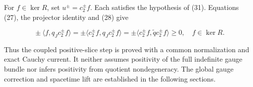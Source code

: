 For $f\in\ker R$, set $u^\pm=c_2^\pm f$. Each satisfies the hypothesis of (31). Equations (27), the projector identity and (28) give

\[
 \boxed{\ 
 \pm\langle f,q_Jc_2^\pm f\rangle
 =\pm\langle c_2^\pm f,q_Jc_2^\pm f\rangle
 =\pm\langle c_2^\pm f,\widetilde q c_2^\pm f\rangle\ge0,
 \quad f\in\ker R.
 \ }
 \tag{32}
\]

Thus the coupled positive-slice step is proved with a common normalization and exact Cauchy current. It neither assumes positivity of the full indefinite gauge bundle nor infers positivity from quotient nondegeneracy. The global gauge correction and spacetime lift are established in the following sections.

